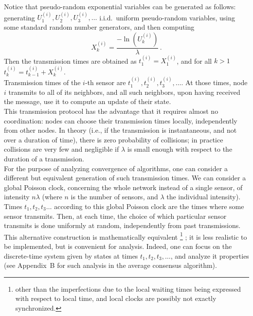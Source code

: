 \documentclass{article}
\begin{document}
Notice that pseudo-random exponential variables can be generated as follows: generating $U_1^{(i)}, U_2^{(i)},U_3^{(i)}, \dots$ i.i.d.~uniform pseudo-random variables, using some standard random number generators, and then computing
\[ X_k^{(i)} = \frac{-\ln(U_k^{(i)})}{\lambda} \,.\]
Then the transmission times are obtained as $t_1^{(i)} = X_1^{(i)}$, and for all $k >1$  $t_k^{(i)} = t_{k-1}^{(i)} +X_k^{(i)}$.\\


Transmission times of the $i$-th sensor are $t_1^{(i)}, t_2^{(i)}, t_3^{(i)}, \dots$.
At those times, node $i$ transmits to all of its neighbors, and all such neighbors, upon having received the message, use it to compute an update of their state. \\

This transmission protocol has the advantage that it requires almost no coordination: nodes can choose their transmission times locally, independently from other nodes. In theory (i.e., if the transmission is instantaneous, and not over a duration of time), there is zero probability of collisions; in practice collisions are very few and negligible if $\lambda$ is small enough with respect to the duration of a transmission.\\

For the purpose of analyzing convergence of algorithms, one can consider a different but equivalent generation of such transmission times. We can consider a global Poisson clock, concerning the whole network instead of a single sensor, of intensity $n \lambda$ (where $n$ is the number of sensors, and $\lambda$ the individual intensity). Times $t_1, t_2, t_3 \dots$ according to this global Poisson clock are the times where some sensor transmits. Then, at each time, the choice of which particular sensor transmits is done uniformly at random, independently from past transmissions. This alternative construction is mathematically equivalent%
\footnote{other than the imperfections due to the local waiting times being expressed with respect to local time, and local clocks are possibly not exactly synchronized.}%
; it  is less realistic to be implemented, but is convenient for analysis. Indeed, one can focus on the discrete-time system given by states at times $t_1, t_2, t_3, \dots$, and analyze it properties (see Appendix~B for such analysis in the average consensus algorithm).\\
\end{document}
